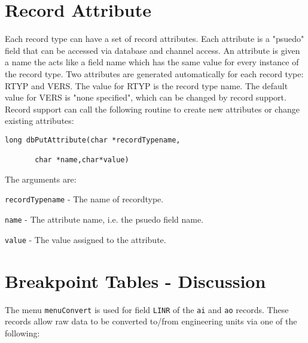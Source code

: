 \section{Record Attribute}

Each record type can have a set of record attributes. Each attribute is a "psuedo" field that can be accessed via database 
and channel access. An attribute is given a name the acts like a field name which has the same value for every instance of 
the record type. Two attributes are generated automatically for each record type: RTYP and VERS. The value for RTYP is 
the record type name. The default value for VERS is "none specified", which can be changed by record support. Record 
support can call the following routine to create new attributes or change existing attributes:

\begin{verbatim}long dbPutAttribute(char *recordTypename,

       char *name,char*value)
\end{verbatim}The arguments are:

\begin{description}\item \verb|recordTypename| - The name of recordtype.

\item \verb|name| - The attribute name, i.e. the psuedo field name.

\item \verb|value| - The value assigned to the attribute.

\end{description}\section{Breakpoint Tables - Discussion}

The menu \verb|menuConvert| is used for field \verb|LINR| of the \verb|ai| and \verb|ao| records. These records allow raw data to be converted 
to/from engineering units via one of the following:

